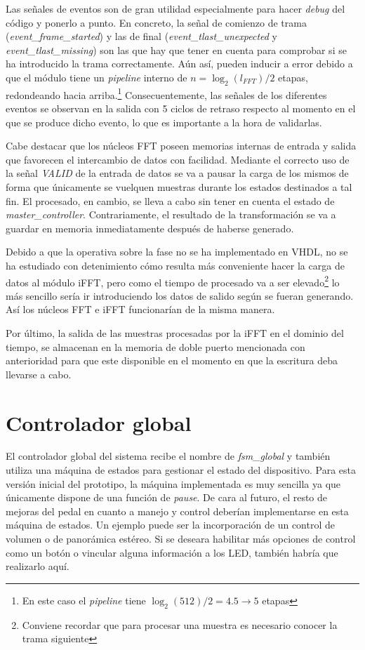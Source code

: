 Las señales de eventos son de gran utilidad especialmente para hacer \emph{debug} del código y ponerlo a punto. En concreto, la señal de comienzo de trama (\emph{event\_frame\_started}) y las de final (\emph{event\_tlast\_unexpected} y \emph{event\_tlast\_missing}) son las que hay que tener en cuenta para comprobar si se ha introducido la trama correctamente. Aún así, pueden inducir a error debido a que el módulo tiene un \emph{pipeline} interno de $n=\log_{2}(l_{FFT})/2$ etapas, redondeando hacia arriba.\footnote{En este caso el \emph{pipeline} tiene $\log_{2}(512)/2 = 4.5 \rightarrow 5$ etapas} Consecuentemente, las señales de los diferentes eventos se observan en la salida con 5 ciclos de retraso respecto al momento en el que se produce dicho evento, lo que es importante a la hora de validarlas.

Cabe destacar que los núcleos FFT poseen memorias internas de entrada y salida que favorecen el intercambio de datos con facilidad. Mediante el correcto uso de la señal \emph{VALID} de la entrada de datos se va a pausar la carga de los mismos de forma que únicamente se vuelquen muestras durante los estados destinados a tal fin. El procesado, en cambio, se lleva a cabo sin tener en cuenta el estado de \emph{master\_controller}. Contrariamente, el resultado de la transformación se va a guardar en memoria inmediatamente después de haberse generado.

Debido a que la operativa sobre la fase no se ha implementado en VHDL, no se ha estudiado con detenimiento cómo resulta más conveniente hacer la carga de datos al módulo iFFT, pero como el tiempo de procesado va a ser elevado\footnote{Conviene recordar que para procesar una muestra es necesario conocer la trama siguiente} lo más sencillo sería ir introduciendo los datos de salido según se fueran generando. Así los núcleos FFT e iFFT funcionarían de la misma manera.

Por último, la salida de las muestras procesadas por la iFFT en el dominio del tiempo, se almacenan en la memoria de doble puerto mencionada con anterioridad para que este disponible en el momento en que la escritura deba llevarse a cabo.

\section{Controlador global}
El controlador global del sistema recibe el nombre de \emph{fsm\_global} y también utiliza una máquina de estados para gestionar el estado del dispositivo. Para esta versión inicial del prototipo, la máquina implementada es muy sencilla ya que únicamente dispone de una función de \emph{pause}. De cara al futuro, el resto de mejoras del pedal en cuanto a manejo y control deberían implementarse en esta máquina de estados. Un ejemplo puede ser la incorporación de un control de volumen o de panorámica estéreo. Si se deseara habilitar más opciones de control como un botón o vincular alguna información a los LED, también habría que realizarlo aquí.

